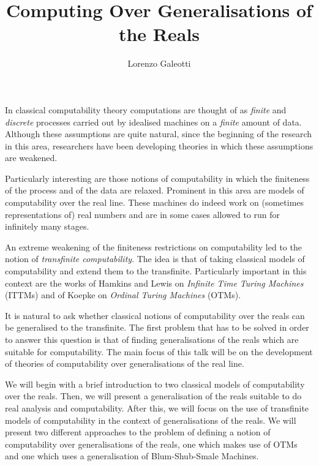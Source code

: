 \documentclass[10pt,a4paper]{article}
\author{Lorenzo Galeotti}
\title{Computing Over Generalisations of the Reals}
\date{}
\theoremstyle{definition}
\theoremstyle{remark}
\begin{document}
\maketitle
In classical computability theory computations are thought of as \emph{finite} and \emph{discrete} processes carried out by idealised machines on a \emph{finite} amount of data. Although these assumptions are quite natural, since the beginning of the research in this area, researchers have been developing theories in which these assumptions are weakened.

Particularly interesting are those notions of computability in which the finiteness of the process and of the data are relaxed. Prominent in this area are models of computability over the real line. These machines do indeed work on (sometimes representations of) real numbers and are in some cases allowed to run for infinitely many stages. 


An extreme weakening of the finiteness restrictions on computability led to the notion of \emph{transfinite computability}. The idea is that of taking classical models of computability and extend them to the transfinite. Particularly important in this context are the works of Hamkins and Lewis on \emph{Infinite Time Turing Machines} (ITTMs) and of Koepke on \emph{Ordinal Turing Machines} (OTMs).


It is natural to ask whether classical notions of computability over the reals can be generalised to the transfinite. The first problem that has to be solved in order to answer this question is that of finding generalisations of the reals which are suitable for computability. The main focus of this talk will be on the development of theories of computability over generalisations of the real line. 

We will begin with a brief introduction to two classical models of computability over the reals. Then, we will present a generalisation of the reals suitable to do real analysis and computability. After this, we will focus on the use of transfinite models of computability in the context of generalisations of the reals. We will present two different approaches to the problem of defining a notion of computability over generalisations of the reals, one which makes use of OTMs and one which uses a generalisation of Blum-Shub-Smale Machines. 
\end{document}
